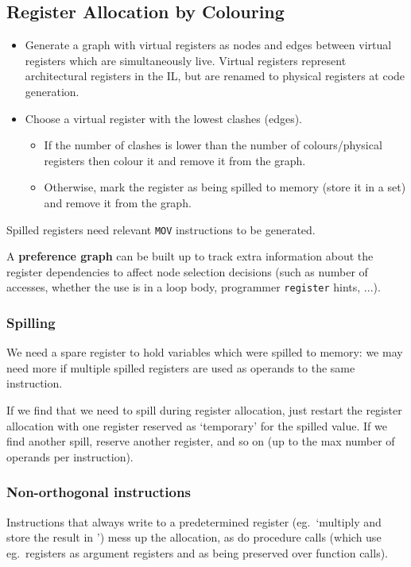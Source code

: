 \documentclass[a4paper, 11pt]{article}
\begin{document}
{    \subsection*{Register Allocation by Colouring}
    {
        \begin{itemize}
        \item Generate a graph with virtual registers as nodes and edges between virtual registers which are simultaneously live. Virtual registers represent architectural registers in the IL, but are renamed to physical registers at code generation.
        \item
        {
            Choose a virtual register with the lowest clashes (edges).

            \begin{itemize}
            \item If the number of clashes is lower than the number of colours/physical registers then colour it and remove it from the graph.
            \item Otherwise, mark the register as being spilled to memory (store it in a set) and remove it from the graph.
            \end{itemize}
        }
        \end{itemize}
            
        Spilled registers need relevant \texttt{MOV} instructions to be generated.

        A \textbf{preference graph} can be built up to track extra information about the register dependencies to affect node selection decisions (such as number of accesses, whether the use is in a loop body, programmer \texttt{register} hints, ...).

        \subsubsection*{Spilling}
        {
            We need a spare register to hold variables which were spilled to memory: we may need more if multiple spilled registers are used as operands to the same instruction.

            If we find that we need to spill during register allocation, just restart the register allocation with one register reserved as `temporary' for the spilled value. If we find another spill, reserve another register, and so on (up to the max number of operands per instruction).
        }
        \subsubsection*{Non-orthogonal instructions}
        {
            Instructions that always write to a predetermined register (eg.\ `multiply and store the result in ') mess up the allocation, as do procedure calls (which use eg.\ registers  as argument registers and  as being preserved over function calls).

}}}
\end{document}
